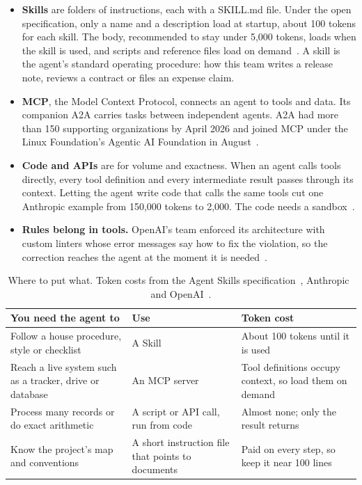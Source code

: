 \documentclass[11pt,letterpaper]{article}
\begin{document}
\begin{itemize}
  \item \textbf{Skills} are folders of instructions, each with a SKILL.md file. Under the open
        specification, only a name and a description load at startup, about 100 tokens for
        each skill. The body, recommended to stay under 5,000 tokens, loads when the skill is
        used, and scripts and reference files load on demand~\cite{skills}. A skill is the
        agent's standard operating procedure: how this team writes a release note, reviews a
        contract or files an expense claim.
  \item \textbf{MCP}, the Model Context Protocol, connects an agent to tools and data. Its
        companion A2A carries tasks between independent agents. A2A had more than 150
        supporting organizations by April 2026 and joined MCP under the Linux Foundation's
        Agentic AI Foundation in August~\cite{a2a,axios}.
  \item \textbf{Code and APIs} are for volume and exactness. When an agent calls tools directly, every
        tool definition and every intermediate result passes through its context. Letting the
        agent write code that calls the same tools cut one Anthropic example from 150,000
        tokens to 2,000. The code needs a sandbox~\cite{mcpcode}.
  \item \textbf{Rules belong in tools.} OpenAI's team enforced its architecture with custom
        linters whose error messages say how to fix the violation, so the correction reaches
        the agent at the moment it is needed~\cite{openai}.
\end{itemize}

\begin{table}[H]
\sffamily\small
\begin{tabularx}{\textwidth}{@{}Y@{\hspace{1em}}Y@{\hspace{1em}}Y@{}}
\toprule
\textbf{You need the agent to} & \textbf{Use} & \textbf{Token cost} \\
\midrule
Follow a house procedure, style or checklist & A Skill & About 100 tokens until it is used \\ \addlinespace[0.28em]
Reach a live system such as a tracker, drive or database & An MCP server & Tool definitions
  occupy context, so load them on demand \\ \addlinespace[0.28em]
Process many records or do exact arithmetic & A script or API call, run from code & Almost
  none; only the result returns \\ \addlinespace[0.28em]
Know the project's map and conventions & A short instruction file that points to documents &
  Paid on every step, so keep it near 100 lines \\
\bottomrule
\end{tabularx}
\caption{Where to put what. Token costs from the Agent Skills specification~\cite{skills},
Anthropic~\cite{mcpcode} and OpenAI~\cite{openai}.}
\label{tab:equip}
\end{table}
\end{document}
